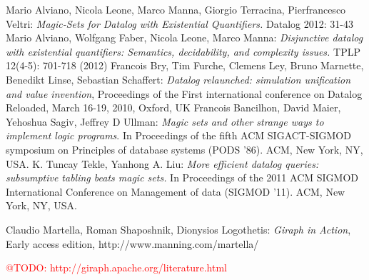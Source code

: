 \documentclass{pracamgr}
\makeatletter
\theoremstyle{plain}
\theoremstyle{definition}
\theoremstyle{remark}
\newcommand{\todo}[1]{\textcolor{red}{@TODO: #1}}
\makeatother
\begin{document}
\begin{thebibliography}{99}
 Mario Alviano, Nicola Leone, Marco Manna, Giorgio Terracina, Pierfrancesco Veltri: \textit{Magic-Sets for Datalog with Existential Quantifiers.} Datalog 2012: 31-43
 Mario Alviano, Wolfgang Faber, Nicola Leone, Marco Manna: \textit{Disjunctive datalog with existential quantifiers: Semantics, decidability, and complexity issues.} TPLP 12(4-5): 701-718 (2012)
 Francois Bry, Tim Furche, Clemens Ley, Bruno Marnette, Benedikt Linse, Sebastian Schaffert: \textit{Datalog relaunched: simulation unification and value invention}, Proceedings of the First international conference on Datalog Reloaded, March 16-19, 2010, Oxford, UK
 Francois Bancilhon, David Maier, Yehoshua Sagiv, Jeffrey D Ullman: \textit{Magic sets and other strange ways to implement logic programs}. In Proceedings of the fifth ACM SIGACT-SIGMOD symposium on Principles of database systems (PODS '86). ACM, New York, NY, USA.
 K. Tuncay Tekle, Yanhong A. Liu: \textit{More efficient datalog queries: subsumptive tabling beats magic sets.} In Proceedings of the 2011 ACM SIGMOD International Conference on Management of data (SIGMOD '11). ACM, New York, NY, USA.

 Claudio Martella, Roman Shaposhnik, Dionysios Logothetis: \textit{Giraph in Action}, Early access edition, http://www.manning.com/martella/

\end{thebibliography}

\todo{http://giraph.apache.org/literature.html}
\end{document}
